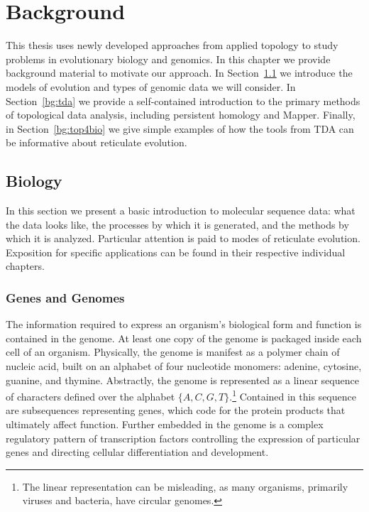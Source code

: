 \chapter{Background}
\label{ch:background}

This thesis uses newly developed approaches from applied topology to study problems in evolutionary biology and genomics.
In this chapter we provide background material to motivate our approach.
In Section~\ref{bg:bio} we introduce the models of evolution and types of genomic data we will consider.
In Section~\ref{bg:tda} we provide a self-contained introduction to the primary methods of topological data analysis, including persistent homology and Mapper.
Finally, in Section~\ref{bg:top4bio} we give simple examples of how the tools from TDA can be informative about reticulate evolution.

\section{Biology}
\label{bg:bio}

In this section we present a basic introduction to molecular sequence data: what the data looks like, the processes by which it is generated, and the methods by which it is analyzed.
Particular attention is paid to modes of reticulate evolution.
Exposition for specific applications can be found in their respective individual chapters.

\subsection{Genes and Genomes}
\label{bg:bio:genes}

The information required to express an organism's biological form and function is contained in the genome.
At least one copy of the genome is packaged inside each cell of an organism.
Physically, the genome is manifest as a polymer chain of nucleic acid, built on an alphabet of four nucleotide monomers: adenine, cytosine, guanine, and thymine.
Abstractly, the genome is represented as a linear sequence of characters defined over the alphabet $\{A,C,G,T\}$.\footnote{The linear representation can be misleading, as many organisms, primarily viruses and bacteria, have circular genomes.}
Contained in this sequence are subsequences representing genes, which code for the protein products that ultimately affect function.
Further embedded in the genome is a complex regulatory pattern of transcription factors controlling the expression of particular genes and directing cellular differentiation and development.

